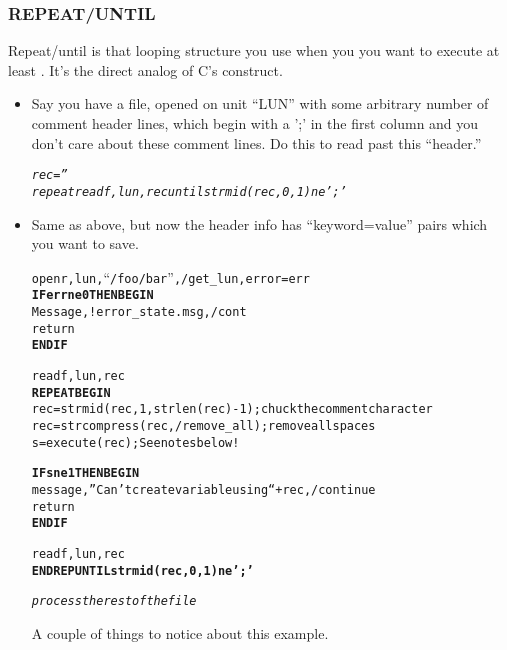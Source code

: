   \subsubsection{REPEAT/UNTIL}\label{sec:qs-Repeat-Until}

    Repeat/until is that looping structure you use when you
   you want to execute at least . It's the
  direct analog of C's  construct.



    \begin{itemize}
      \item {}

          Say you have a file, opened on unit ``LUN'' with some
          arbitrary number of comment header lines, which begin with a
          ';' in the first column and you don't care about these
          comment lines. Do this to read past this ``header.''

\begin{alltt}
  \textit{rec=''}
  \textit{repeat readf,lun,rec until strmid(rec,0,1) ne ';'}
\end{alltt}

      \item {}

        Same as above, but now the header info has ``keyword=value'' pairs
        which you want to save.

\begin{alltt}
  openr, lun, ``/foo/bar'', /get_lun, error=err
  \textbf{IF err ne 0 THEN BEGIN }
    Message,!error_state.msg,/cont
    return
  \textbf{ENDIF }

readf, lun, rec
\textbf{REPEAT BEGIN}
  rec=strmid(rec,1,strlen(rec)-1) ; chuck the comment character
  rec=strcompress(rec,/remove_all); remove all spaces
  s=execute(rec); See notes below!

  \textbf{IF s ne 1 THEN BEGIN}
    message,''Can't create variable using `` + rec,/continue
    return
  \textbf{ENDIF}
  
  readf,lun,rec
\textbf{ENDREP UNTIL strmid(rec,0,1) ne ';'}

\textit{process the rest of the file}

\end{alltt}

       A couple of things to notice about this example.



\end{itemize}
